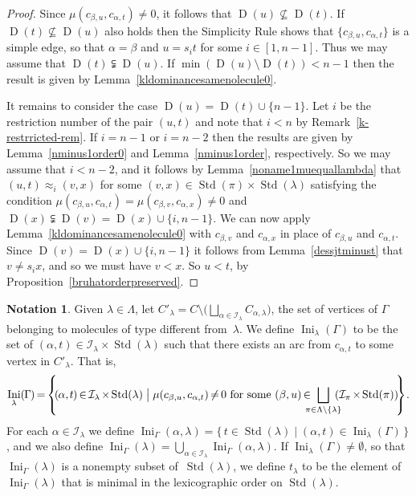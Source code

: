 \documentclass[10pt]{amsart}
\theoremstyle{definition}
\newtheorem{nota}[theo]{Notation}
\DeclareMathOperator{\Ini}{Ini}
\DeclareMathOperator{\STD}{Std}
\DeclareMathOperator{\D}{D}
\newcommand*{\mk}{\mkern -1mu}
\newcommand*{\Mk}{\mkern -2mu}
\begin{document}
\begin{proof}
Since $\mu(c_{\beta,u},c_{\alpha,t}) \neq 0$, it follows that
$\D(u)\nsubseteq\D(t)$. If $\D(t)\nsubseteq\D(u)$ also holds then the
Simplicity Rule
shows that
$\{c_{\beta,u},c_{\alpha,t}\}$ is a simple edge, so that $\alpha=\beta$ and
$u=s_i t$ for some $i\in[1,n-1]$. Thus we may assume that $\D(t)\subsetneqq\D(u)$.
If $\min(\D(u)\setminus\D(t))<n-1$ then
the result is given by Lemma~\ref{kldominancesamenolecule0}.

It remains to consider the case $\D(u)=\D(t)\cup\{n-1\}$. Let $i$ be the restriction
number of the pair $(u,t)$ and note that $i<n$ by Remark~\ref{k-restrricted-rem}.
If $i=n-1$ or $i=n-2$ then the results are given
by Lemma~\ref{nminus1order0} and Lemma~\ref{nminus1order}, respectively. So we may assume that
$i<n-2$, and it follows by Lemma~\ref{noname1muequallambda} that
$(u,t)\approx_i (v,x)$ for some $(v,x)\in\STD(\pi)\times\STD(\lambda)$ satisfying
the condition $\mu(c_{\beta,u},c_{\alpha,t}) = \mu(c_{\beta,v},c_{\alpha,x}) \neq 0$
and $\D(x)\subsetneqq\D(v)=\D(x)\cup\{i,n-1\}$. We can now apply
Lemma~\ref{kldominancesamenolecule0} with $c_{\beta,v}$ and $c_{\alpha,x}$ in place
of $c_{\beta,u}$ and $c_{\alpha,t}$. Since $\D(v)=\D(x)\cup\{i,n-1\}$ it follows
from Lemma~\ref{dessjtminust} that $v\ne s_ix$, and so we must have $v<x$.
So $u<t$, by Proposition~\ref{bruhatorderpreserved}.
\end{proof}

\begin{nota}\label{inidef}
Given $\lambda\in\Lambda$, let $C'_\lambda=
C\setminus\bigl(\bigsqcup_{\alpha\in\mathcal{I}_{\lambda}}C_{\alpha,\lambda}\bigr)$,
the set of vertices of $\Gamma$ belonging to molecules of type different
from~$\lambda$. We define $\Ini_{\lambda}(\Gamma)$ to be the set of
$(\alpha,t)\in\mathcal{I}_{\lambda}\times\STD(\lambda)$ such that there exists
an arc from $c_{\alpha,t}$ to some vertex in $C'_\lambda$. That is,
\[
\Ini_{\lambda}(\mk \Gamma \mk )\Mk = \Mk 
\left\{\Mk \Mk (\mk \alpha,\mk t\mk )\Mk \in\Mk \mathcal{I}_{\lambda}\Mk \times\Mk \STD(\lambda)\bigm|
\mu(c_{\beta,u},c_{\alpha,t})\Mk \neq\Mk 0 \text{ for some } (\beta,u)\Mk \in\Mk \!\!\!\!
\bigsqcup_{\pi\in\Lambda\setminus\{\lambda\}}\Mk \!\!\!
(\mathcal{I}_{\pi}\Mk \times\Mk \STD(\pi))\Mk \Mk \right\}\Mk .
\]
For each $\alpha\in\mathcal{I}_\lambda$ we define
$\Ini_\Gamma(\alpha,\lambda)=\{\,t\in\STD(\lambda)\mid(\alpha,t)\in\Ini_{\lambda}(\Gamma)\,\}$,
and we also define
$\Ini_\Gamma(\lambda)=\bigcup_{\alpha\in\mathcal{I}_\lambda}\Ini_\Gamma(\alpha,\lambda)$.
If $\Ini_{\lambda}(\Gamma)\neq\emptyset$, so that
$\Ini_\Gamma(\lambda)$ is a nonempty subset of~$\STD(\lambda)$, we define $t_\lambda$ to
be the element of $\Ini_\Gamma(\lambda)$ that is minimal in the lexicographic order
on $\STD(\lambda)$.
\end{nota}
\end{document}

